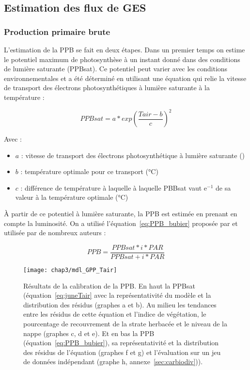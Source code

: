 \subsection{Estimation des flux de GES}

\subsubsection{Production primaire brute}


L'estimation de la PPB se fait en deux étapes.
Dans un premier temps on estime le potentiel maximum de photosynthèse à un instant donné dans des conditions de lumière saturante (PPBsat).
Ce potentiel peut varier avec les conditions environnementales et a été déterminé en utilisant une équation qui relie la vitesse de transport des électrons photosynthétiques à lumière saturante à la température \citep{june2004} :

\begin{equation}\label{eq:juneTair}
PPBsat = a * exp\left(\frac{Tair - b}{c}\right)^2
\end{equation}

Avec :
\begin{itemize}
\item $a$ : vitesse de transport des électrons photosynthétique à lumière saturante (\si{\uml})
\item $b$ : température optimale pour ce transport (\si{\degreeCelsius})
\item $c$ : différence de température à laquelle à laquelle PBBsat vaut e$^{-1}$ de sa valeur à la température optimale (\si{\degreeCelsius})
\end{itemize}

À partir de ce potentiel à lumière saturante, la PPB est estimée en prenant en compte la luminosité.
On a utilisé l'équation~\ref{eq:PPB_bubier} proposée par \citep{bubier1998} et utilisée par de nombreux auteurs \citep{bortoluzzi2006a,worrall2009}:

\begin{equation} \label{eq:PPB_bubier}
PPB = \frac{PPBsat * i * PAR}{PPBsat + i * PAR}
\end{equation}

\begin{figure} %
\centering
\texttt{[image: chap3/mdl\_GPP\_Tair]}
\caption{Résultats de la calibration de la PPB. En haut la PPBsat (équation~\ref{eq:juneTair} avec la représentativité du modèle et la distribution des résidus (graphes a et b). Au milieu les tendances entre les résidus de cette équation et l'indice de végétation, le pourcentage de recouvrement de la strate herbacée et le niveau de la nappe (graphes c, d et e). Et en bas la PPB (équation~\ref{eq:PPB_bubier}), sa représentativité et la distribution des résidus de l'équation (graphes f et g) et l'évaluation sur un jeu de données indépendant (graphe h, annexe~\ref{sec:carbiodiv})).}
\label{fig:mdl_GPP_Tair}
\end{figure}

